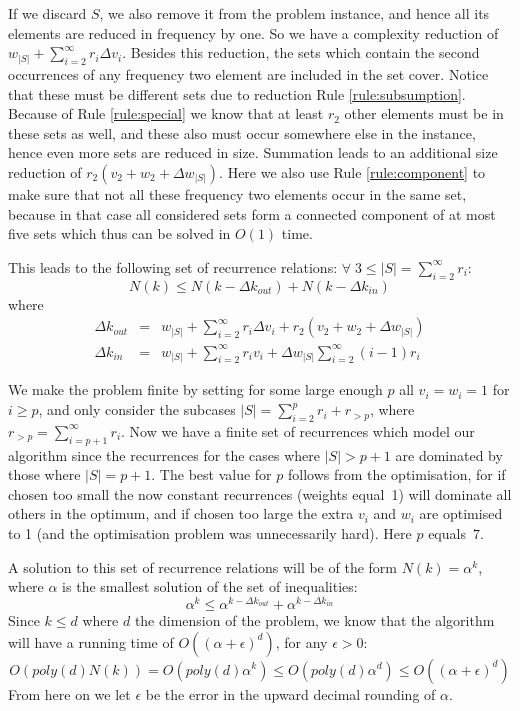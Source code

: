 \documentclass[fleqn]{stacs_proc}
\begin{document}
If we discard $S$, we also remove it from the problem instance, and hence all its elements are reduced in frequency by one.
So we have a complexity reduction of $w_{|S|} + \sum_{i=2}^\infty r_i \Delta v_i$.
Besides this reduction, the sets which contain the second occurrences of any frequency two element
are included in the set cover. Notice that these must be different sets due to reduction Rule \ref{rule:subsumption}.
Because of Rule \ref{rule:special} we know that at least $r_2$ other elements must be in these sets as well,
and these also must occur somewhere else in the instance, hence even more sets are reduced in size.
Summation leads to an additional size reduction of $r_2(v_2 + w_2 + \Delta w_{|S|})$.
Here we also use Rule \ref{rule:component} to make sure that not all these frequency two elements
occur in the same set, because in that case all considered sets form a connected component of at most five sets
which thus can be solved in $O(1)$ time.

This leads to the following set of recurrence relations: $\forall \; 3 \leq |S|=\sum_{i=2}^\infty r_i$:
\[ N(k) \leq  N(k - \Delta k_{out}) + N(k - \Delta k_{in}) \]
where
\begin{eqnarray}
\Delta k_{out} & = &  w_{|S|} + \sum_{i=2}^\infty r_i \Delta v_i + r_2(v_2 + w_2 + \Delta w_{|S|})   \nonumber \\
\Delta k_{in}  & = &  w_{|S|} + \sum_{i=2}^\infty r_i v_i + \Delta w_{|S|} \sum_{i=2}^\infty (i-1) r_i    \nonumber
\end{eqnarray}

We make the problem finite by setting for some large enough $p$ all $v_i = w_i = 1$ for $i \geq p$,
and only consider the subcases $|S|=\sum_{i=2}^{p} r_i + r_{>p}$, where $r_{>p} = \sum_{i=p+1}^\infty r_i$.
Now we have a finite set of recurrences which model our algorithm since
the recurrences for the cases where $|S| > p+1$ are dominated by those where $|S| = p+1$.
The best value for $p$ follows from the optimisation, for if chosen too small the now constant
recurrences (weights equal~1) will dominate all others in the optimum, and if chosen too large
the extra $v_i$ and $w_i$ are optimised to 1 (and the optimisation problem was unnecessarily hard).
Here $p$ equals~$7$.

A solution to this set of recurrence relations will be of the form $N(k) = \alpha^k$, 
where $\alpha$ is the smallest solution of the set of inequalities:
\[ \alpha^k \leq \alpha^{k-\Delta k_{out}} + \alpha^{k-\Delta k_{in}} \]
Since $k \leq d$ where $d$ the dimension of the problem, we know that the algorithm
will have a running time of $O((\alpha+\epsilon)^d)$, for any $\epsilon > 0$:
\[ O(poly(d)N(k)) = O(poly(d) \alpha^k) \leq O(poly(d) \alpha^d) \leq O((\alpha + \epsilon )^d) \]
From here on we let $\epsilon$ be the error in the upward decimal rounding of $\alpha$.
\end{document}
